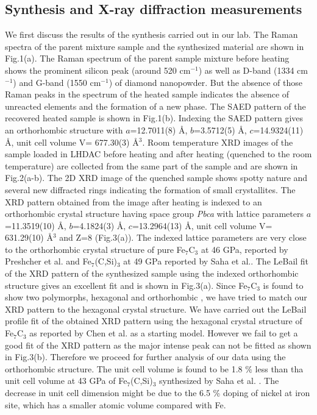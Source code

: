 \documentclass[prb,aps,preprint]{revtex4-2}
\begin{document}
\subsection{Synthesis and X-ray diffraction measurements}
We first discuss the results of the synthesis carried out in our lab. The Raman spectra of the parent mixture sample and the synthesized material are shown in Fig.1(a). The Raman spectrum of the parent sample mixture before heating shows the prominent silicon peak (around 520 cm$^{-1}$) as well as D-band (1334 cm$^{-1}$) and G-band (1550 cm$^{-1}$) of diamond nanopowder. But the absence of those Raman peaks in the spectrum of the heated sample indicates the absence of unreacted elements and the formation of a new phase. The SAED pattern of the recovered heated sample is shown in Fig.1(b). Indexing the SAED pattern gives an orthorhombic structure with $a$=12.7011(8) \AA , $b$=3.5712(5) \AA , $c$=14.9324(11) \AA , unit cell volume V= 677.30(3) \AA$^{3}$. Room temperature XRD images of the sample loaded in LHDAC before heating and after heating (quenched to the room temperature) are collected from the same part of the sample and are shown in Fig.2(a-b). The 2D XRD image of the quenched sample shows spotty nature and several new diffracted rings indicating the formation of small crystallites. The XRD pattern obtained from the image after heating is indexed to an orthorhombic crystal structure having space group \textit{Pbca} with lattice parameters $a$=11.3519(10) \AA , $b$=4.1824(3) \AA , $c$=13.2964(13) \AA , unit cell volume V= 631.29(10) \AA$^{3}$ and Z=8 (Fig.3(a)). The indexed lattice parameters are very close to the orthorhombic crystal structure of pure Fe$_{7}$C$_{3}$ at 46 GPa, reported by Preshcher et al. \cite{prescher2015high}  and Fe$_{7}$(C,Si)$_{3}$ at 49 GPa reported by Saha et al.\cite{saha2021synthesis}. The LeBail fit of the XRD pattern of the synthesized sample using the indexed orthorhombic structure gives an excellent fit and is shown in Fig.3(a). 
Since Fe$_{7}$C$_{3}$ is found to show two polymorphs, hexagonal\cite{mookherjee2011high,nakajima2011thermoelastic,chen2014hidden} and orthorhombic \cite{eckstrom1950new,herbstein1964identification,fruchart1969twin,tsuzuki1984high,litasov2015thermal,prescher2015high,lai2018high}, we have tried to match our XRD pattern to the hexagonal crystal structure. We have carried out the LeBail profile fit of the obtained XRD pattern using the hexagonal crystal structure of Fe$_{7}$C$_{3}$ as reported by Chen et al.\cite{chen2012magneto} as a starting model. However we fail to get a good fit of the XRD pattern as the major intense peak can not be fitted as shown in Fig.3(b). Therefore we proceed for further analysis of our data using the orthorhombic structure. The unit cell volume is found to be 1.8 \% less than tha unit cell volume at 43 GPa of Fe$_{7}$(C,Si)$_{3}$ synthesized by Saha et al. \cite{saha2021synthesis}. The decrease in unit cell dimension might be due to the 6.5 \% doping of nickel at iron site, which has a smaller atomic volume compared with Fe\cite{hirao2022equations}. 
\end{document}
